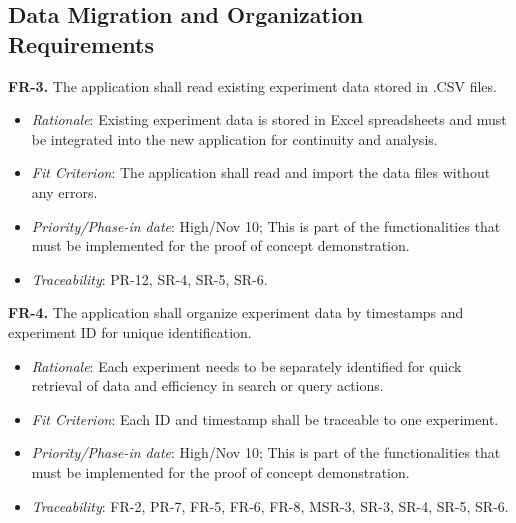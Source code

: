 \documentclass[12pt]{article}
\begin{document}
\subsection{Data Migration and Organization Requirements}
\textbf{FR-3.} The application shall read existing experiment data stored in .CSV files.
    \begin{itemize}
      \item \textit{Rationale}: Existing experiment data is stored in Excel spreadsheets and must be integrated into the new application for continuity and analysis.
      \item \textit{Fit Criterion}: The application shall read and import the data files without any errors.
      \item \textit{Priority/Phase-in date}: High/Nov 10; This is part of the functionalities that must be implemented for the proof of concept demonstration.
      \item \textit{Traceability}: PR-12, SR-4, SR-5, SR-6.
    \end{itemize}
\textbf{FR-4.} The application shall organize experiment data by timestamps and experiment ID for unique identification.
    \begin{itemize}
      \item \textit{Rationale}: Each experiment needs to be separately identified for quick retrieval of data and efficiency in search or query actions.
      \item \textit{Fit Criterion}: Each ID and timestamp shall be traceable to one experiment.
      \item \textit{Priority/Phase-in date}: High/Nov 10; This is part of the functionalities that must be implemented for the proof of concept demonstration.
      \item \textit{Traceability}: FR-2, PR-7, FR-5, FR-6, FR-8, MSR-3, SR-3, SR-4, SR-5, SR-6.
    \end{itemize}
\end{document}

